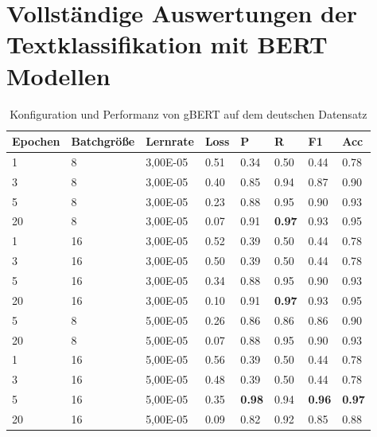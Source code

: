 \documentclass[ngerman]{ttlab-qualify}
\begin{document}
\chapter{Vollständige Auswertungen der Textklassifikation mit BERT Modellen}
\newpage
\begin{table}[!ht]
    \centering
    \caption{Konfiguration und Performanz von gBERT auf dem deutschen Datensatz}
    \begin{tabular}{|l|l|l|l|l|l|l|l|}
    \hline
        \textbf{Epochen} & \textbf{Batchgröße} & \textbf{Lernrate} & \textbf{Loss} & \textbf{P} & \textbf{R} & \textbf{F1} & \textbf{Acc} \\ \hline
        1 & 8 & 3,00E-05 & 0.51 & 0.34 & 0.50 & 0.44 & 0.78 \\ \hline
        3 & 8 & 3,00E-05 & 0.40 & 0.85 & 0.94 & 0.87 & 0.90 \\ \hline
        5 & 8 & 3,00E-05 & 0.23 & 0.88 & 0.95 & 0.90 & 0.93 \\ \hline
        20 & 8 & 3,00E-05 & 0.07 & 0.91 & \textbf{0.97} & 0.93 & 0.95 \\ \hline
        1 & 16 & 3,00E-05 & 0.52 & 0.39 & 0.50 & 0.44 & 0.78 \\ \hline
        3 & 16 & 3,00E-05 & 0.50 & 0.39 & 0.50 & 0.44 & 0.78 \\ \hline
        5 & 16 & 3,00E-05 & 0.34 & 0.88 & 0.95 & 0.90 & 0.93 \\ \hline
        20 & 16 & 3,00E-05 & 0.10 & 0.91 & \textbf{0.97} & 0.93 & 0.95 \\ \hline
        5 & 8 & 5,00E-05 & 0.26 & 0.86 & 0.86 & 0.86 & 0.90 \\ \hline
        20 & 8 & 5,00E-05 & 0.07 & 0.88 & 0.95 & 0.90 & 0.93 \\ \hline
        1 & 16 & 5,00E-05 & 0.56 & 0.39 & 0.50 & 0.44 & 0.78 \\ \hline
        3 & 16 & 5,00E-05 & 0.48 & 0.39 & 0.50 & 0.44 & 0.78 \\ \hline
        5 & 16 & 5,00E-05 & 0.35 &\textbf{0.98} & 0.94 & \textbf{0.96} & \textbf{0.97} \\ \hline
        20 & 16 & 5,00E-05 & 0.09 & 0.82 & 0.92 & 0.85 & 0.88 \\ \hline
    \end{tabular}
\end{table}
\end{document}
